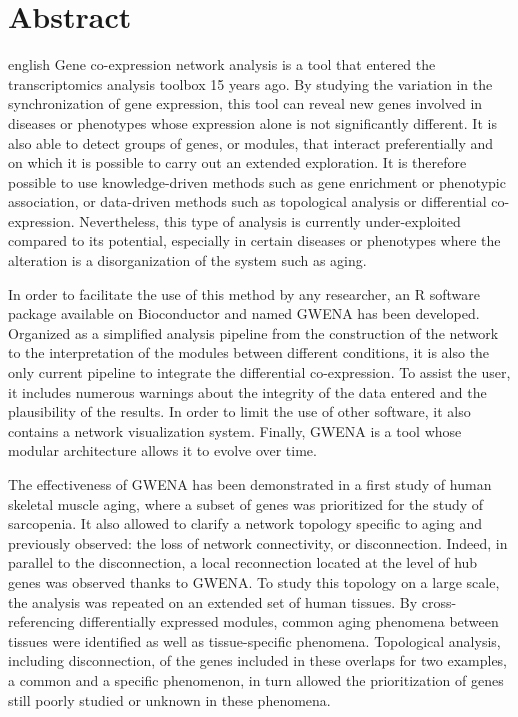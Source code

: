 \chapter*{Abstract}                      %

\begin{otherlanguage*}{english}
Gene co-expression network analysis is a tool that entered the transcriptomics analysis toolbox 15 years ago. By studying the variation in the synchronization of gene expression, this tool can reveal new genes involved in diseases or phenotypes whose expression alone is not significantly different. It is also able to detect groups of genes, or modules, that interact preferentially and on which it is possible to carry out an extended exploration. It is therefore possible to use knowledge-driven methods such as gene enrichment or phenotypic association, or data-driven methods such as topological analysis or differential co-expression. Nevertheless, this type of analysis is currently under-exploited compared to its potential, especially in certain diseases or phenotypes where the alteration is a disorganization of the system such as aging. 

In order to facilitate the use of this method by any researcher, an R software package available on Bioconductor and named GWENA has been developed. Organized as a simplified analysis pipeline from the construction of the network to the interpretation of the modules between different conditions, it is also the only current pipeline to integrate the differential co-expression. To assist the user, it includes numerous warnings about the integrity of the data entered and the plausibility of the results. In order to limit the use of other software, it also contains a network visualization system. Finally, GWENA is a tool whose modular architecture allows it to evolve over time.

The effectiveness of GWENA has been demonstrated in a first study of human skeletal muscle aging, where a subset of genes was prioritized for the study of sarcopenia. It also allowed to clarify a network topology specific to aging and previously observed: the loss of network connectivity, or disconnection. Indeed, in parallel to the disconnection, a local reconnection located at the level of hub genes was observed thanks to GWENA. To study this topology on a large scale, the analysis was repeated on an extended set of human tissues. By cross-referencing differentially expressed modules, common aging phenomena between tissues were identified as well as tissue-specific phenomena. Topological analysis, including disconnection, of the genes included in these overlaps for two examples, a common and a specific phenomenon, in turn allowed the prioritization of genes still poorly studied or unknown in these phenomena.


\end{otherlanguage*}
